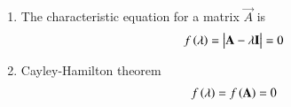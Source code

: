 \begin{enumerate}[label=\thesubsection.\arabic*.,ref=\thesubsection.\theenumi]
	\item 
The characteristic equation for a matrix $\vec{A}$ is 
\begin{align}
\label{eq:chareq}
	f\left(\lambda\right) =\begin{vmatrix}\mathbf{A}-\lambda \mathbf{I}\end{vmatrix}=0
\end{align}
\item Cayley-Hamilton theorem
\begin{align}
\label{eq:cayley}
	f\left(\lambda\right)=f\left(\mathbf{A}\right) = 0
\end{align}
\end{enumerate}

